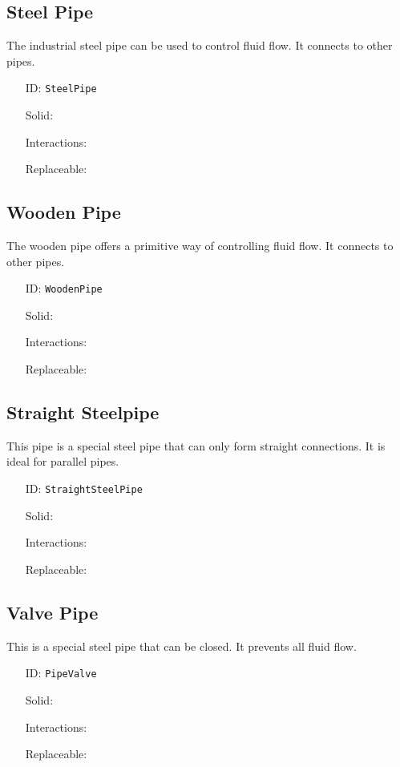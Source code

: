 \subsection{Steel Pipe}\label{subsec:blocks_steel pipe}
The industrial steel pipe can be used to control fluid flow.
It connects to other pipes.
\newline
\begin{itemize}[nosep]
    \item[ID:] \texttt{SteelPipe}
    \item[Solid:]  \Checkmark \item[Interactions:]  \XSolidBrush \item[Replaceable:]  \XSolidBrush
\end{itemize}

\subsection{Wooden Pipe}\label{subsec:blocks_wooden pipe}
The wooden pipe offers a primitive way of controlling fluid flow.
It connects to other pipes.
\newline
\begin{itemize}[nosep]
    \item[ID:] \texttt{WoodenPipe}
    \item[Solid:]  \Checkmark \item[Interactions:]  \XSolidBrush \item[Replaceable:]  \XSolidBrush
\end{itemize}

\subsection{Straight Steelpipe}\label{subsec:blocks_straight steelpipe}
This pipe is a special steel pipe that can only form straight connections.
It is ideal for parallel pipes.
\newline
\begin{itemize}[nosep]
    \item[ID:] \texttt{StraightSteelPipe}
    \item[Solid:]  \Checkmark \item[Interactions:]  \XSolidBrush \item[Replaceable:]  \XSolidBrush
\end{itemize}

\subsection{Valve Pipe}\label{subsec:blocks_valve pipe}
This is a special steel pipe that can be closed. It prevents all fluid flow.
\newline
\begin{itemize}[nosep]
    \item[ID:] \texttt{PipeValve}
    \item[Solid:]  \Checkmark \item[Interactions:]  \Checkmark \item[Replaceable:]  \XSolidBrush
\end{itemize}

